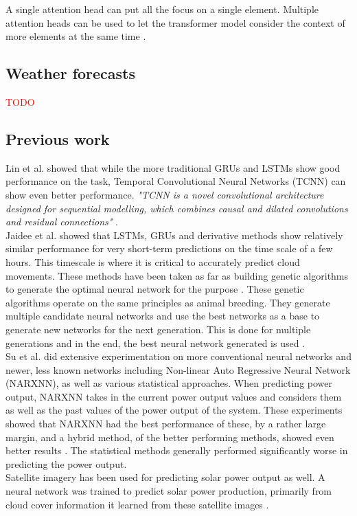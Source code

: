 A single attention head can put all the focus on a single element. Multiple attention heads can be used to let the transformer model consider the context of more elements at the same time \cite{rohrer_transformers_2021}.

\subsection{Weather forecasts}
\textcolor{red}{TODO}

\subsection{Previous work}
Lin et al. \cite{lin_temporal_2020} showed that while the more traditional GRUs and LSTMs show good performance on the task, Temporal Convolutional Neural Networks (TCNN) can show even better performance. \textit{"TCNN is a novel convolutional architecture designed for sequential modelling, which combines causal and dilated convolutions
and residual connections"} \cite{lin_temporal_2020}. \\
Jaidee et al. \cite{jaidee_very_2019} showed that LSTMs, GRUs and derivative methods show relatively similar performance for very short-term predictions on the time scale of a few hours. This timescale is where it is critical to accurately predict cloud movements. 
These methods have been taken as far as building genetic algorithms to generate the optimal neural network for the purpose \cite{jaidee_very_2019}. These genetic algorithms operate on the same principles as animal breeding. They generate multiple candidate neural networks and use the best networks as a base to generate new networks for the next generation. This is done for multiple generations and in the end, the best neural network generated is used \cite{jaidee_very_2019}.\\
Su et al. \cite{su_machine_2019} did extensive experimentation on more conventional neural networks and newer, less known networks including  Non-linear Auto Regressive Neural Network (NARXNN), as well as various statistical approaches. When predicting power output, NARXNN takes in the current power output values and considers them as well as the past values of the power output of the system. These experiments showed that NARXNN had the best performance of these, by a rather large margin, and a hybrid method, of the better performing methods, showed even better results \cite{anderson_using_2018}. The statistical methods generally performed significantly worse in predicting the power output. \\
Satellite imagery has been used for predicting solar power output as well. A neural network was trained to predict solar power production, primarily from cloud cover information it learned from these satellite images \cite{jang_solar_2016}.\\
 
